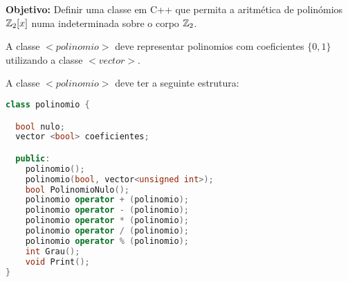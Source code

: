 
\usepackage{hyperref}
\newcommand{\shift}[1]{\setlength{\leftskip}{15 mm}{#1}\medskip}

\newcommand{\poli}{{$< polinomio >$ }}



\nextsect


{\bf Objetivo:} Definir uma classe em C++ que permita a aritmética de polinómios $\mathbb{Z}_2[x]$ numa indeterminada sobre o corpo $\mathbb{Z}_2$.

 A classe \poli deve representar polinomios com coeficientes $\{0,1\}$
utilizando a classe $< vector >$.

A classe \poli deve ter a seguinte estrutura:

\begin{lstlisting}[language=C++]
class polinomio {

  bool nulo; 
  vector <bool> coeficientes;

  public:
    polinomio();
    polinomio(bool, vector<unsigned int>);
    bool PolinomioNulo();
    polinomio operator + (polinomio);
    polinomio operator - (polinomio);
    polinomio operator * (polinomio);
    polinomio operator / (polinomio);
    polinomio operator % (polinomio);	
    int Grau();	
    void Print();
}
\end{lstlisting}


